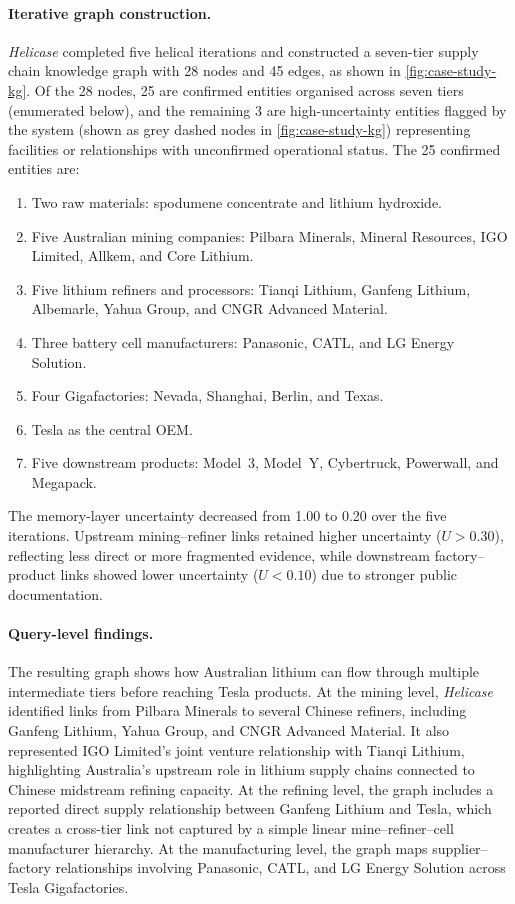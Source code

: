 \documentclass{article}
\begin{document}
\paragraph{Iterative graph construction.}
\textit{Helicase} completed five helical iterations and constructed a seven-tier supply chain knowledge graph with 28 nodes and 45 edges, as shown in \autoref{fig:case-study-kg}. Of the 28 nodes, 25 are confirmed entities organised across seven tiers (enumerated below), and the remaining 3 are high-uncertainty entities flagged by the system (shown as grey dashed nodes in \autoref{fig:case-study-kg}) representing facilities or relationships with unconfirmed operational status. The 25 confirmed entities are:
\begin{enumerate}
    \item Two raw materials: spodumene concentrate and lithium hydroxide.
    \item Five Australian mining companies: Pilbara Minerals, Mineral Resources, IGO Limited, Allkem, and Core Lithium.
    \item Five lithium refiners and processors: Tianqi Lithium, Ganfeng Lithium, Albemarle, Yahua Group, and CNGR Advanced Material.
    \item Three battery cell manufacturers: Panasonic, CATL, and LG Energy Solution.
    \item Four Gigafactories: Nevada, Shanghai, Berlin, and Texas.
    \item Tesla as the central OEM.
    \item Five downstream products: Model~3, Model~Y, Cybertruck, Powerwall, and Megapack.
\end{enumerate}
The memory-layer uncertainty decreased from 1.00 to 0.20 over the five iterations. Upstream mining--refiner links retained higher uncertainty ($U > 0.30$), reflecting less direct or more fragmented evidence, while downstream factory--product links showed lower uncertainty ($U < 0.10$) due to stronger public documentation.

\paragraph{Query-level findings.}
The resulting graph shows how Australian lithium can flow through multiple intermediate tiers before reaching Tesla products. At the mining level, \textit{Helicase} identified links from Pilbara Minerals to several Chinese refiners, including Ganfeng Lithium, Yahua Group, and CNGR Advanced Material. It also represented IGO Limited's joint venture relationship with Tianqi Lithium, highlighting Australia's upstream role in lithium supply chains connected to Chinese midstream refining capacity. At the refining level, the graph includes a reported direct supply relationship between Ganfeng Lithium and Tesla, which creates a cross-tier link not captured by a simple linear mine--refiner--cell manufacturer hierarchy. At the manufacturing level, the graph maps supplier--factory relationships involving Panasonic, CATL, and LG Energy Solution across Tesla Gigafactories.
\end{document}
